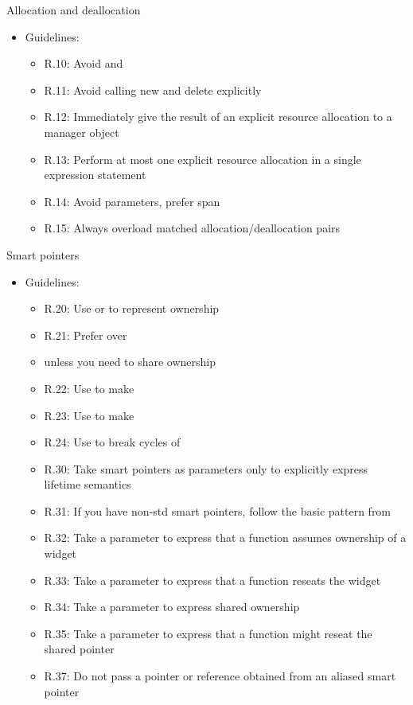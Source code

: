 \begin{frame}[t]{Allocation and deallocation}
\begin{itemize}
  \item Guidelines:
    \begin{itemize}
      \item R.10: Avoid  and 
      \item R.11: Avoid calling new and delete explicitly
      \item R.12: Immediately give the result of an 
            explicit resource allocation to a manager object
      \item R.13: Perform at most one explicit resource allocation 
            in a single expression statement
      \item R.14: Avoid \cppkey{[]} parameters, prefer span
      \item R.15: Always overload matched allocation/deallocation pairs
    \end{itemize}
\end{itemize}
\end{frame}

\begin{frame}[t]{Smart pointers}
\begin{itemize}
  \item Guidelines:
    \begin{itemize}
      \fontsize{9pt}{9pt}\selectfont
      \item R.20: Use  or  to represent ownership
      \item R.21: Prefer  over  
      \item       unless you need to share ownership
      \item R.22: Use  to make 
      \item R.23: Use  to make 
      \item R.24: Use  to break cycles of 
      \item R.30: Take smart pointers as parameters only to explicitly express lifetime semantics
      \item R.31: If you have non-std smart pointers, follow the basic pattern from 
      \item R.32: Take a  parameter to express that a function assumes ownership of a widget
      \item R.33: Take a  parameter to express that a function reseats the widget
      \item R.34: Take a  parameter to express shared ownership
      \item R.35: Take a  parameter to express that a function might reseat the shared pointer
      \item R.37: Do not pass a pointer or reference obtained from an aliased smart pointer
    \end{itemize}
\end{itemize}
\end{frame}
